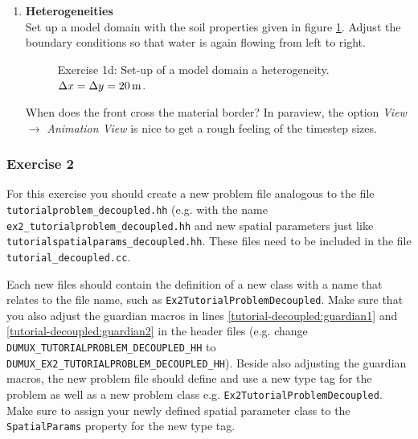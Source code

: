 \begin{enumerate}
\item \textbf{Heterogeneities}  \\
Set up a model domain with the soil properties given in figure \ref{tutorial-deoucpled:exercise1_d}. Adjust the boundary conditions so that water is again flowing from left to right.
\begin{figure}[bt]
\centering
{} 
\caption{Exercise 1d: Set-up of a model domain a heterogeneity. $\Delta x = \Delta y = \unit[20]{m}$.}
\label{tutorial-deoucpled:exercise1_d}
\end{figure}
When does the front cross the material border? In paraview, the option \textit{View} $\rightarrow$ \textit{Animation View} is nice to get a rough feeling of the timestep sizes.
\end{enumerate}

\subsubsection{Exercise 2}
For this exercise you should create a new problem file analogous to
the file \texttt{tutorialproblem\_decoupled.hh} (e.g. with the name 
\texttt{ex2\_tutorialproblem\_decoupled.hh} and new spatial parameters 
just like \texttt{tutorialspatialparams\_decoupled.hh}. These files need to
be included in the file \texttt{tutorial\_decoupled.cc}. 

Each new files should contain the definition of a new class with a 
name that relates to the file name, such as \texttt{Ex2TutorialProblemDecoupled}. 
Make sure that you also adjust the guardian
macros in lines \ref{tutorial-decoupled:guardian1} and \ref{tutorial-decoupled:guardian2}
 in the header files (e.g. change \\
\texttt{DUMUX\_TUTORIALPROBLEM\_DECOUPLED\_HH} to
\texttt{DUMUX\_EX2\_TUTORIALPROBLEM\_DECOUPLED\_HH}).  Beside also adjusting the guardian macros, 
the new problem file should define and use a new type tag for the problem as well as a new problem class
e.g. \texttt{Ex2TutorialProblemDecoupled}. Make sure to assign your newly defined spatial 
parameter class to the \texttt{SpatialParams} property for the new 
type tag. 

